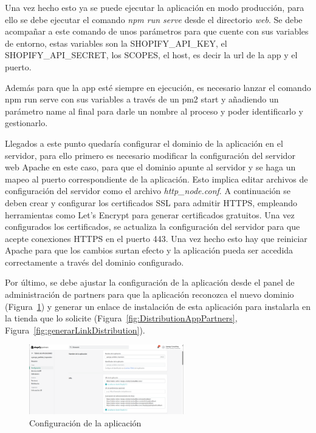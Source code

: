 \documentclass[11pt]{article}
\begin{document}
Una vez hecho esto ya se puede ejecutar la aplicación en modo producción, para ello se debe ejecutar el comando \textit{npm run serve} desde el directorio \textit{web}. Se debe acompañar
a este comando de unos parámetros para que cuente con sus variables de entorno, estas variables son la SHOPIFY\_API\_KEY, el SHOPIFY\_API\_SECRET, los SCOPES,  el host, es decir la url de la app y el puerto.

Además para que la app esté siempre en ejecución, es necesario lanzar el comando npm run serve con sus variables a través de un pm2 start y añadiendo un parámetro name al final para
darle un nombre al proceso y poder identificarlo y gestionarlo. 

Llegados a este punto quedaría configurar el dominio de la aplicación en el servidor, para ello primero es necesario modificar la configuración del servidor web Apache en este caso, para que 
el dominio apunte al servidor y se haga un mapeo al puerto correspondiente de la aplicación. Esto implica editar archivos de configuración del servidor como el archivo \textit{http\_node.conf}. 
A continuación se deben crear y configurar los certificados SSL para admitir HTTPS, empleando herramientas como Let's Encrypt para generar certificados gratuitos. Una vez configurados los
certificados, se actualiza la configuración del servidor para que acepte conexiones HTTPS en el puerto 443. Una vez hecho esto hay que reiniciar Apache para que los cambios surtan
efecto y la aplicación pueda ser accedida correctamente a través del dominio configurado.

Por último, se debe ajustar la configuración de la aplicación desde el panel de administración de partners para que la aplicación reconozca el nuevo dominio (Figura~\ref{fig:ConfiguracionAppPartners}) y generar un enlace de instalación de esta aplicación
para instalarla en la tienda que lo solicite (Figura~\ref{fig:DistributionAppPartners}, Figura~\ref{fig:generarLinkDistribution}).

\begin{figure}[H]
    \centering
    \includegraphics[width=0.6\textwidth]{imagenes/panelPartnersDistribution.png}
    \caption{\label{fig:ConfiguracionAppPartners}Configuración de la aplicación}
    \vspace{\fill}
\end{figure}
\end{document}
